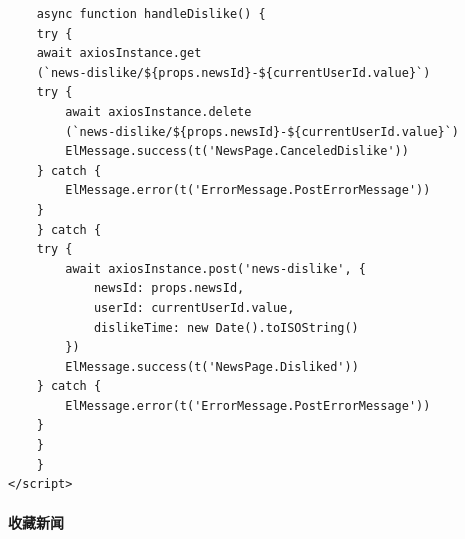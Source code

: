 \begin{itemize}
\begin{verbatim}
	async function handleDislike() {
	try {
	await axiosInstance.get
	(`news-dislike/${props.newsId}-${currentUserId.value}`)
	try {
		await axiosInstance.delete
		(`news-dislike/${props.newsId}-${currentUserId.value}`)
		ElMessage.success(t('NewsPage.CanceledDislike'))
	} catch {
		ElMessage.error(t('ErrorMessage.PostErrorMessage'))
	}
	} catch {
	try {
		await axiosInstance.post('news-dislike', {
			newsId: props.newsId,
			userId: currentUserId.value,
			dislikeTime: new Date().toISOString()
		})
		ElMessage.success(t('NewsPage.Disliked'))
	} catch {
		ElMessage.error(t('ErrorMessage.PostErrorMessage'))
	}
	}
	}
</script>
	\end{verbatim}
\end{itemize}

\paragraph{收藏新闻}

